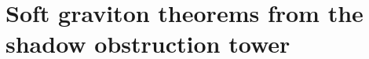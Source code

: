 %
%

\section{Soft graviton theorems from the shadow obstruction tower}
\label{sec:thqg-soft-graviton-theorems}

\providecommand{\Sh}{\operatorname{Sh}}
\providecommand{\cA}{\mathcal{A}}
\providecommand{\cV}{\mathcal{V}}
\providecommand{\MC}{\text{MC}}
\providecommand{\gAmod}{\mathfrak{g}_{\cA}^{\mathrm{mod}}}
\providecommand{\Defcyc}{\operatorname{Def}_{\mathrm{cyc}}}
\providecommand{\dzero}{d_0}
\providecommand{\barBch}{\bar{B}^{\text{ch}}}
\providecommand{\Omegach}{\Omega^{\text{ch}}}
\providecommand{\dfib}{d_{\mathrm{fib}}}
\providecommand{\Ydg}{\mathcal{Y}^{\mathrm{dg}}}
\providecommand{\Gmod}{\mathcal{G}^{\mathrm{mod}}}
\providecommand{\Convstr}{\operatorname{Conv}_{\mathrm{str}}}
\providecommand{\Convinf}{\operatorname{Conv}_{\infty}}
\providecommand{\Definfmod}{\operatorname{Def}_{\infty}^{\mathrm{mod}}}
\providecommand{\Res}{\operatorname{Res}}
\providecommand{\Tr}{\operatorname{Tr}}
\providecommand{\ad}{\operatorname{ad}}
\providecommand{\id}{\mathrm{id}}
\providecommand{\rank}{\operatorname{rank}}
\providecommand{\wt}{\operatorname{wt}}
\providecommand{\Hom}{\operatorname{Hom}}
\providecommand{\End}{\operatorname{End}}
\providecommand{\Sym}{\operatorname{Sym}}
\providecommand{\Aut}{\operatorname{Aut}}
\providecommand{\sgn}{\operatorname{sgn}}
\providecommand{\Dg}[1]{D_{#1}}
\providecommand{\mcurv}[1]{m_0^{(#1)}}
\providecommand{\colldiv}[2]{D_{#1#2}}
\providecommand{\LogForm}[2]{\eta_{#1#2}}
\providecommand{\fg}{\mathfrak{g}}
\providecommand{\cW}{\mathcal{W}}

